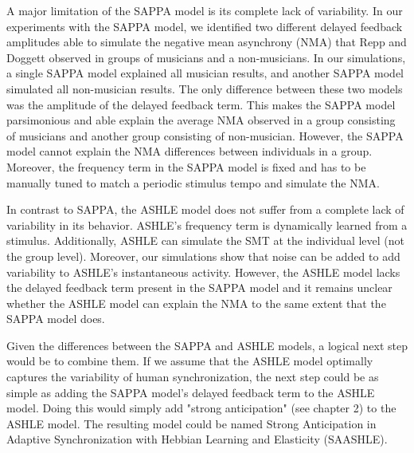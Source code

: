 \documentclass{report}
\begin{document}
A major limitation of the SAPPA model is its complete lack of variability. In our experiments with the SAPPA model, we identified two different delayed feedback amplitudes able to simulate the negative mean asynchrony (NMA) that Repp and Doggett \cite{repp2007tapping} observed in groups of musicians and a non-musicians. In our simulations, a single SAPPA model explained all musician results, and another SAPPA model simulated all non-musician results. The only difference between these two models was the amplitude of the delayed feedback term. This makes the SAPPA model parsimonious and able explain the average NMA observed in a group consisting of musicians and another group consisting of non-musician. However, the SAPPA model cannot explain the NMA differences between individuals in a group. Moreover, the frequency term in the SAPPA model is fixed and has to be manually tuned to match a periodic stimulus tempo and simulate the NMA. 

In contrast to SAPPA, the ASHLE model does not suffer from a complete lack of variability in its behavior. ASHLE's frequency term is dynamically learned from a stimulus. Additionally, ASHLE can simulate the SMT at the individual level (not the group level). Moreover, our simulations show that noise can be added to add variability to ASHLE's instantaneous activity. However, the ASHLE model lacks the delayed feedback term present in the SAPPA model and it remains unclear whether the ASHLE model can explain the NMA to the same extent that the SAPPA model does. 

Given the differences between the SAPPA and ASHLE models, a logical next step would be to combine them. If we assume that the ASHLE model optimally captures the variability of human synchronization, the next step could be as simple as adding the SAPPA model's delayed feedback term to the ASHLE model. Doing this would simply add "strong anticipation" (see chapter 2) to the ASHLE model. The resulting model could be named Strong Anticipation in Adaptive Synchronization with Hebbian Learning and Elasticity (SAASHLE). 
\end{document}
